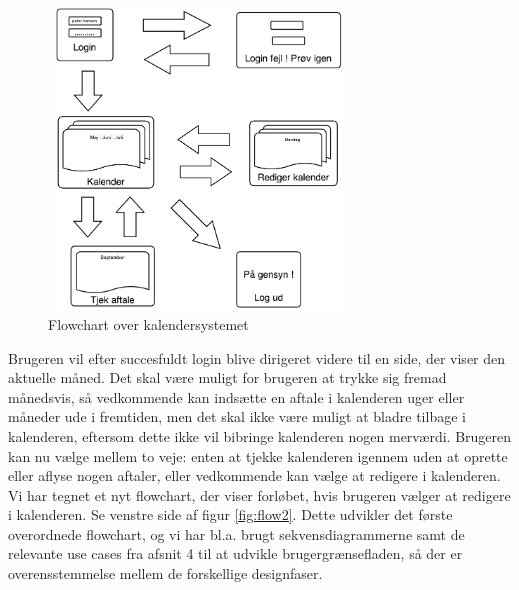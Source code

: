 \documentclass[12pt]{article}   %
\begin{document}
\begin{figure}[!ht]
\begin{center}
\includegraphics[width=8cm, height=8cm]{flow1.pdf}
\caption{Flowchart over kalendersystemet}
\label{fig:flow1}
\end{center}
\end{figure}

Brugeren vil efter succesfuldt login blive dirigeret videre til en side, der viser den aktuelle måned. Det skal være muligt for brugeren at trykke sig fremad månedsvis, så vedkommende kan indsætte en aftale i kalenderen uger eller måneder ude i fremtiden, men det skal ikke være muligt at bladre tilbage i kalenderen, eftersom dette ikke vil bibringe kalenderen nogen merværdi. Brugeren kan nu vælge mellem to veje: enten at tjekke kalenderen igennem uden at oprette eller aflyse nogen aftaler, eller vedkommende kan vælge at redigere i kalenderen. Vi har tegnet et nyt flowchart, der viser forløbet, hvis brugeren vælger at redigere i kalenderen. Se venstre side af figur \ref{fig:flow2}. Dette udvikler det første overordnede flowchart, og vi har bl.a. brugt sekvensdiagrammerne samt de relevante use cases fra afsnit 4 til at udvikle brugergrænsefladen, så der er overensstemmelse mellem de forskellige designfaser. \\
\end{document}
